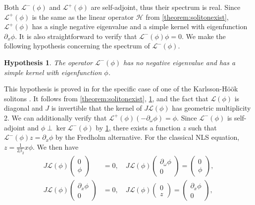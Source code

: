 \documentclass[12pt]{elsarticle}
\def\calH{{\mathcal H}}
\def\calL{{\mathcal L}}
\newtheorem{hypothesis}{Hypothesis}
\begin{document}
Both $\calL^-(\phi)$ and $\calL^+(\phi)$ are self-adjoint, thus their spectrum is real. Since $\calL^+(\phi)$ is the same as the linear operator $\calH$ from \cref{theorem:solitonexist}, $\calL^+(\phi)$ has a single negative eigenvalue and a simple kernel with eigenfunction $\partial_x \phi$. It is also straightforward to verify that $\calL^-(\phi) \phi = 0$. We make the following hypothesis concerning the spectrum of $\calL^-(\phi)$.
\begin{hypothesis}\label{hyp:Lminusspec}
The operator $\calL^-(\phi)$ has no negative eigenvalue and has a simple kernel with eigenfunction $\phi$.
\end{hypothesis}
This hypothesis is proved in \cite{Natali2015} for the specific case of one of the Karlsson-H{\"o}{\"o}k solitons \cite{KarllsonHook}. It follows from \cref{theorem:solitonexist}, \cref{hyp:Lminusspec}, and the fact that $\calL(\phi)$ is diagonal and $J$ is invertible that the kernel of $J \calL(\phi)$ has geometric multiplicity 2. We can additionally verify that $\calL^+(\phi)(-\partial_\omega \phi) = \phi$. Since $\calL^-(\phi)$ is self-adjoint and $\phi \perp \ker \calL^-(\phi)$ by \cref{hyp:Lminusspec}, there exists a function $z$ such that $\calL^-(\phi) z = \partial_x \phi$ by the Fredholm alternative. For the classical NLS equation, $z = \frac{1}{2 \beta_2} x \phi$. We then have
\begin{equation}\label{Lphikernel}
\begin{aligned}
J \calL(\phi)\begin{pmatrix}0 \\ \phi \end{pmatrix} &= 0, \quad
J \calL(\phi)\begin{pmatrix} \partial_\omega \phi \\ 0 \end{pmatrix} = \begin{pmatrix}0 \\ \phi \end{pmatrix}, \\
J \calL(\phi)\begin{pmatrix}\partial_x\phi \\ 0 \end{pmatrix} &= 0, \quad
J \calL(\phi)\begin{pmatrix} 0 \\ z \end{pmatrix} = \begin{pmatrix}\partial_x\phi \\ 0 \end{pmatrix},
\end{aligned}
\end{equation}
\end{document}
